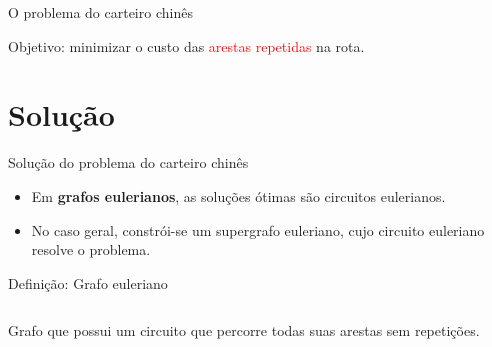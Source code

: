 \documentclass{beamer}
\begin{document}
\begin{frame}{O problema do carteiro chinês}
    \begin{center}
        Objetivo: minimizar o custo das \textcolor{red}{arestas repetidas} na rota.
    \end{center}
\end{frame}

\section{Solução}

\begin{frame}{Solução do problema do carteiro chinês}
    \begin{itemize}
        \item Em \textbf{grafos eulerianos}, as soluções ótimas são circuitos eulerianos.
        \item No caso geral, constrói-se um supergrafo euleriano, cujo circuito euleriano resolve o problema.
    \end{itemize}

    \vspace{10px}

    \begin{block}{Definição: Grafo euleriano}
        \begin{columns}
                Grafo que possui um circuito que percorre todas suas arestas sem repetições. 



            \vspace{4px}
            
        \end{columns} 
    \end{block}

\end{frame}
\end{document}
